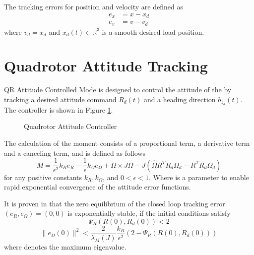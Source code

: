 The tracking errors for position and velocity are defined as
\begin{align}\label{key}
e_x&=x-x_d\\
e_v&=v-v_d
\end{align}
where $ v_d=\dot{x}_d $ and $ x_d(t) \in \mathbb{R}^3$ is a smooth desired load position.

\section{Quadrotor Attitude Tracking}
QR Attitude Controlled Mode is designed to control the attitude of the  by tracking a desired  attitude command $ R_d(t) $ and a heading direction $ b_{1_d}(t) $. The controller is shown in Figure \ref{fig:con.qrattloop}.

\begin{figure}[h!]
	\centering
	\caption{Quadrotor Attitude Controller\label{fig:con.qrattloop}}
\end{figure}		

The calculation of the moment consists of a proportional term, a derivative term and a canceling term, and is defined as follows
\begin{equation}\label{eq:con.M}
M = \frac{1}{\epsilon^2}k_Re_R-\frac{1}{\epsilon}k_\Omega e_\Omega+\Omega\times J\Omega-J(\hat{\Omega}R^TR_d\Omega_d-R^TR_d\dot{\Omega}_d)
\end{equation}
for any positive constants $ k_R, k_\Omega $, and $ 0<\epsilon<1 $. Where  is a parameter to enable rapid exponential convergence of the attitude error functions.

It is proven in \cite{Lee2010} that the zero equilibrium of the closed loop tracking error $ (e_R,e_\Omega)=(0,0) $ is exponentially stable, if the initial conditions satisfy
\begin{equation}\label{eq:dom1}
\Psi_R(R(0),R_d(0))<2
\end{equation}
\begin{equation}\label{eq:dom2}
\parallel e_\Omega(0)\parallel^2<\frac{2}{\lambda_M(J)}\frac{k_R}{\epsilon^2}(2-\Psi_R(R(0),R_d(0)))
\end{equation}
where  denotes the maximum eigenvalue.

